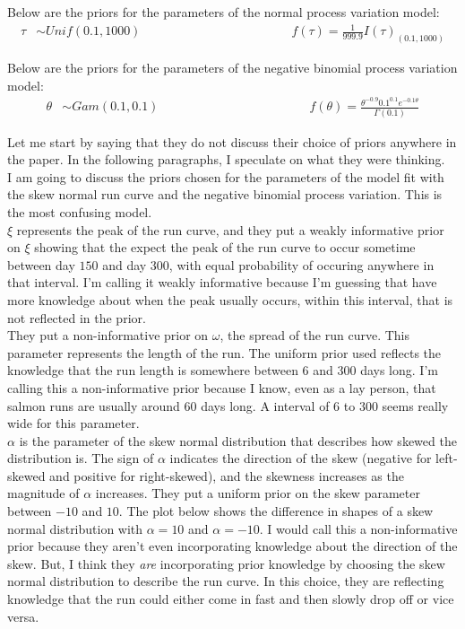 \documentclass[12pt]{article}\usepackage[]{graphicx}\usepackage[]{color}
\begin{document}
\begin{doublespacing}
\begin{enumerate}
Below are the priors for the parameters of the normal process variation model:
\begin{align*}
\tau &\sim Unif(0.1, 1000) \hspace{2in} f(\tau) = \frac{1}{999.9} I(\tau)_{(0.1, 1000)} 
\end{align*}

Below are the priors for the parameters of the negative binomial process variation model:
\begin{align*}
\theta &\sim Gam(0.1, 0.1) \hspace{2in} f(\theta) = \frac{\theta^{-0.9}0.1^{0.1}e^{-0.1\theta}}{\Gamma(0.1)}
\end{align*}

\noindent Let me start by saying that they do not discuss their choice of priors anywhere in the paper. In the following paragraphs, I speculate on what they were thinking. \\

\noindent I am going to discuss the priors chosen for the parameters of the model fit with the skew normal run curve and the negative binomial process variation. This is the most confusing model. \\

\noindent $\xi$ represents the peak of the run curve, and they put a weakly informative prior on $\xi$ showing that the expect the peak of the run curve to occur sometime between day $150$ and day $300$, with equal probability of occuring anywhere in that interval. I'm calling it weakly informative because I'm guessing that have more knowledge about when the peak usually occurs, within this interval, that is not reflected in the prior. \\

\noindent They put a non-informative prior on $\omega$, the spread of the run curve. This parameter represents the length of the run. The uniform prior used reflects the knowledge that the run length is somewhere between $6$ and $300$ days long. I'm calling this a non-informative prior because I know, even as a lay person, that salmon runs are usually around $60$ days long. A interval of $6$ to $300$ seems really wide for this parameter.\\

\noindent $\alpha$ is the parameter of the skew normal distribution that describes how skewed the distribution is. The sign of $\alpha$ indicates the direction of the skew (negative for left-skewed and positive for right-skewed), and the skewness increases as the magnitude of $\alpha$ increases. They put a uniform prior on the skew parameter between $-10$ and $10$. The plot below shows the difference in shapes of a skew normal distribution with $\alpha=10$ and $\alpha=-10$. I would call this a non-informative prior because they aren't even incorporating knowledge about the direction of the skew. But, I think they {\it are} incorporating prior knowledge by choosing the skew normal distribution to describe the run curve. In this choice, they are reflecting knowledge that the run could either come in fast and then slowly drop off or vice versa.


\end{enumerate}
\end{doublespacing}
\end{document}
